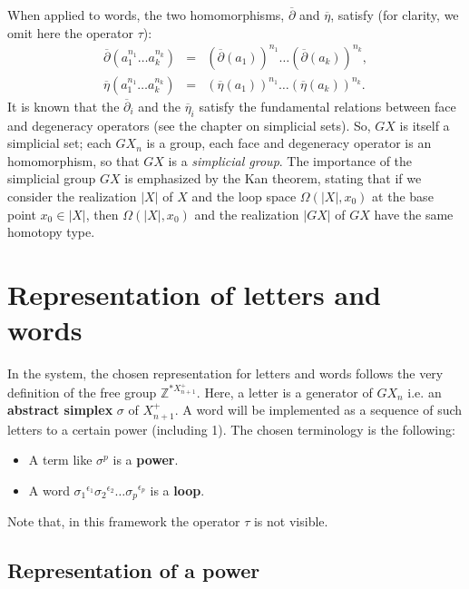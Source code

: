 When applied to words, the two homomorphisms, $\overline{\partial}$ and $\overline{\eta}$,  satisfy
(for cla\-ri\-ty, we omit here the operator $\tau$):
\begin{eqnarray*}
\overline{\partial}(a_1^{n_1}\ldots a_k^{n_k}) &=& (\overline{\partial}(a_1))^{n_1}\ldots
                                                   (\overline{\partial}(a_k))^{n_k}, \\
\overline{\eta}(a_1^{n_1}\ldots a_k^{n_k}) &=& (\overline{\eta}(a_1))^{n_1}\ldots (\overline{\eta}(a_k))^{n_k}.
\end{eqnarray*}
It is known  that the $\overline{\partial}_i$ and the $\overline{\eta}_i$ satisfy the
fundamental relations between face and degeneracy operators (see the chapter on simplicial sets). So,
$GX$ is itself a simplicial set; each $GX_n$ is a group, each face and degeneracy operator
is an homomorphism, so that $GX$ is a {\em simplicial group}.
The importance of the simplicial group $GX$ is emphasized by the Kan theorem, stating
that if we consider the realization $|X|$ of $X$ and the loop space  $\Omega(|X|, x_0)$ at
the base point $x_0 \in |X|$,  then $\Omega(|X|, x_0)$ and
the realization $|GX|$ of $GX$ have the same  homotopy type.

\section {Representation of letters and words}

In the system, the chosen representation for letters and words follows the very definition
of the free group $\mathbb{Z}^{*X_{n+1}^+}$. Here, a letter is a generator of $GX_n$ i.e. an {\bf abstract simplex}
$\sigma$ of $X^+_{n+1}$.
A word will be implemented  as a sequence of such letters to a certain power (including 1).
The chosen terminology is the following:
\begin{itemize}
\item A term like $\sigma^p$ is a {\bf power}.
\item A word ${\sigma_1}^{\epsilon_1} {\sigma_2}^{\epsilon_2} \ldots {\sigma_p}^{\epsilon_p}$
is a {\bf loop}.
\end{itemize}
Note that, in this framework the operator $\tau$ is not visible.

\subsection{Representation of a power}

